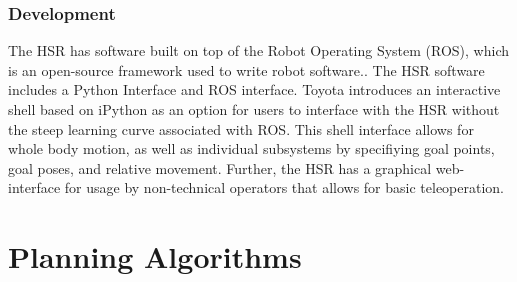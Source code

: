 \documentclass[12pt]{article}
\begin{document}
        \subsubsection{Development}    
            The HSR has software built on top of the Robot Operating System (ROS), which is an open-source framework used to write robot software.\cite{quigley_ros_2009}. The HSR software includes a Python Interface and ROS interface. Toyota introduces an interactive shell based on iPython as an option for users to interface with the HSR without the steep learning curve associated with ROS. This shell interface allows for whole body motion, as well as individual subsystems by specifiying goal points, goal poses, and relative movement. Further, the HSR has a graphical web-interface for usage by non-technical operators that allows for basic teleoperation.
    \newpage
\section{Planning Algorithms}
\end{document}
